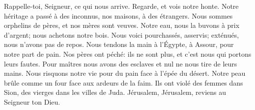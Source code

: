 Rappelle-toi, Seigneur, ce qui nous arrive. Regarde, et vois notre honte.
Notre héritage a passé à des inconnus, nos maisons, à des étrangers.
Nous sommes orphelins de pères, et nos mères sont veuves.
Notre eau, nous la buvons à prix d’argent; nous achetons notre bois.
Nous voici pourchassés, asservis; exténués, nous n’avons pas de repos.
Nous tendons la main à l’Égypte, à Assour, pour notre part de pain.
Nos pères ont péché: ils ne sont plus, et c’est nous qui portons leurs fautes.
Pour maîtres nous avons des esclaves et nul ne nous tire de leurs mains.
Nous risquons notre vie pour du pain face à l’épée du désert.
Notre peau brûle comme un four face aux ardeurs de la faim.
Ils ont violé des femmes dans Sion, des vierges dans les villes de Juda.
Jérusalem, Jérusalem, reviens au Seigneur ton Dieu.
